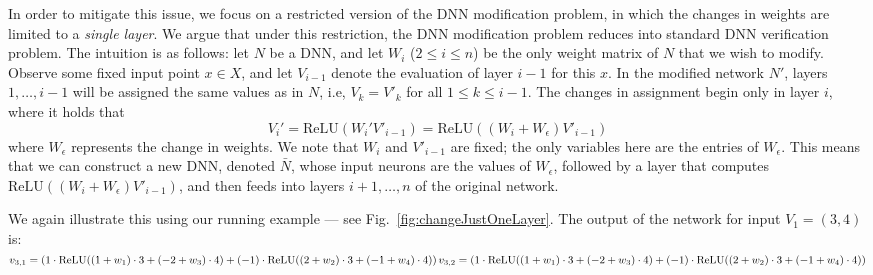 \documentclass{easychair}
\newcommand{\relu}{\text{ReLU}\xspace{}}
\begin{document}
In order to mitigate this issue, we focus on a restricted version of
the DNN modification problem, in which the changes in weights are
limited to a \emph{single layer}. We argue that under this
restriction, the DNN modification problem reduces into standard DNN
verification problem. The intuition is as follows: let $N$ be a DNN,
and let $W_i$ ($2\leq i\leq n$) be the only weight matrix of $N$ that
we wish to modify. Observe some fixed input point $x\in X$, and let
$V_{i-1}$ denote the evaluation of layer $i-1$ for this $x$. In the
modified network $N'$, layers $1,\ldots,i-1$ will be assigned the same
values as in $N$, i.e, $V_k=V'_k$ for all $1\leq k\leq i-1$. The
changes in assignment begin only in layer $i$, where it holds that
\[
  V_i' = \relu{}(W_i'V'_{i-1}) = \relu{}((W_i+W_\epsilon)V'_{i-1})
\]
where $W_\epsilon$ represents the change in weights. We note that
$W_i$ and $V'_{i-1}$ are fixed; the only variables here are the
entries of $W_\epsilon$. This means that we can construct a new DNN,
denoted $\bar{N}$, whose input neurons are the values of $W_\epsilon$,
followed by a layer that computes $\relu{}((W_i+W_\epsilon)V'_{i-1})$,
and then feeds into layers $i+1,\ldots,n$ of the original network.

We again illustrate this using our running example --- see
Fig.~\ref{fig:changeJustOneLayer}. The output of the network for input $V_1=(3,4)$ is:
\\
\begin{math}
v_{3,1}=\bracketsR{1\cdot\relu{}((1+w_1)\cdot 3+(-2+w_3)\cdot 4)+(-1)\cdot\relu{}((2+w_2)\cdot 3+(-1+w_4)\cdot 4)}\\
v_{3,2}=\bracketsR{1\cdot\relu{}((1+w_1)\cdot 3+(-2+w_3)\cdot 4)+(-1)\cdot\relu{}((2+w_2)\cdot 3+(-1+w_4)\cdot 4)}
\end{math}
\end{document}
